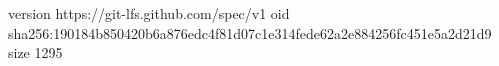 version https://git-lfs.github.com/spec/v1
oid sha256:190184b850420b6a876edc4f81d07c1e314fede62a2e884256fc451e5a2d21d9
size 1295

